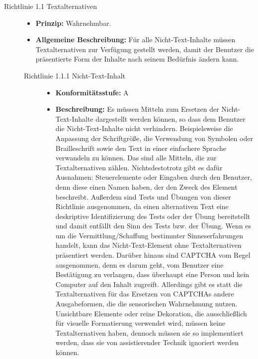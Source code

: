 \begin{description}
	\item[Richtlinie 1.1 Textalternativen]\hfill
	\begin{itemize}
		\item \textbf{Prinzip:} Wahrnehmbar.
		\item \textbf{Allgemeine Beschreibung:} Für alle Nicht-Text-Inhalte müssen Textalternativen zur Verfügung gestellt werden, damit der Benutzer die
		präsentierte Form der Inhalte nach seinem Bedürfnis ändern kann.
	\end{itemize}
	
	\begin{description}
		\item[Richtlinie 1.1.1 Nicht-Text-Inhalt]\hfill
		\begin{itemize}
			\item \textbf{Konformitätsstufe:} A
			\item \textbf{Beschreibung:} Es müssen Mitteln zum Ersetzen der Nicht-Text-Inhalte dargestellt werden können, so dass dem Benutzer die
			Nicht-Text-Inhalte nicht verhindern. Beispielsweise die Anpassung der Schriftgröße, die Verwendung von Symbolen oder Brailleschrift sowie den Text 
			in einer einfachere Sprache verwandeln zu können. Das sind alle Mitteln, die zur Textalternativen zählen.
			Nichtsdestotrotz gibt es dafür Ausnahmen: Steuerelemente oder Eingaben durch den Benutzer, denn diese einen Namen haben, der den Zweck des Element
			beschreibt. Außerdem sind Tests und Übungen von dieser Richtlinie ausgenommen, da einen alternativen Text eine deskriptive Identifizierung
			des Tests oder der Übung bereitstellt und damit entfällt den Sinn des Tests bzw. der Übung. Wenn es um die Vermittlung/Schaffung bestimmter
			Sinneserfahrungen handelt, kann das Nicht-Text-Element ohne Textalternativen präsentiert werden. Darüber hinaus sind \ac{CAPTCHA} vom Regel ausgenommen,
			denn es darum geht, vom Benutzer eine Bestätigung zu verlangen, dass überhaupt eine Person und kein Computer auf den Inhalt zugreift. Allerdings gibt
			es statt die Textalternativen für das Ersetzen von \ac{CAPTCHA}s andere Ausgabeformen, die die sensorischen Wahrnehmung nutzen. Unsichtbare Elemente
			oder reine Dekoration, die ausschließlich für visuelle Formatierung verwendet wird, müssen keine Textalternativen haben, dennoch müssen
			sie so implementiert werden, dass sie von assistierender Technik ignoriert werden können.
		\end{itemize}
	\end{description}
	

\end{description}
